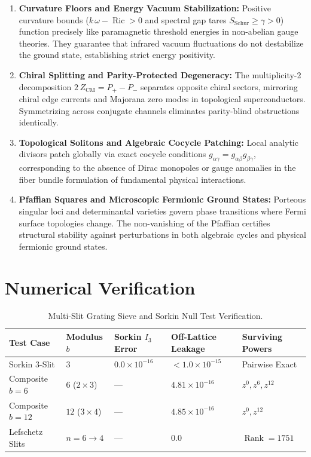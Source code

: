 \documentclass[11pt,a4paper]{article}
\theoremstyle{definition}
\begin{document}
\begin{enumerate}
  \item \textbf{Curvature Floors and Energy Vacuum Stabilization:} 
  Positive curvature bounds ($k\,\omega - \operatorname{Ric} > 0$ and spectral gap tares $S_{\mathrm{Schur}} \ge \gamma > 0$) function precisely like paramagnetic threshold energies in non-abelian gauge theories. They guarantee that infrared vacuum fluctuations do not destabilize the ground state, establishing strict energy positivity.
  
  \item \textbf{Chiral Splitting and Parity-Protected Degeneracy:} 
  The multiplicity-2 decomposition $2\,Z_{\mathrm{CM}} = P_+ - P_-$ separates opposite chiral sectors, mirroring chiral edge currents and Majorana zero modes in topological superconductors. Symmetrizing across conjugate channels eliminates parity-blind obstructions identically.
  
  \item \textbf{Topological Solitons and Algebraic Cocycle Patching:} 
  Local analytic divisors patch globally via exact cocycle conditions $g_{\alpha\gamma} = g_{\alpha\beta} g_{\beta\gamma}$, corresponding to the absence of Dirac monopoles or gauge anomalies in the fiber bundle formulation of fundamental physical interactions.
  
  \item \textbf{Pfaffian Squares and Microscopic Fermionic Ground States:} 
  Porteous singular loci and determinantal varieties govern phase transitions where Fermi surface topologies change. The non-vanishing of the Pfaffian certifies structural stability against perturbations in both algebraic cycles and physical fermionic ground states.
\end{enumerate}

\section{Numerical Verification}

\begin{table}[htbp]
\centering
\caption{Multi-Slit Grating Sieve and Sorkin Null Test Verification.}
\label{tab:compiler}
\footnotesize
\begin{tabular}{@{}>{\raggedright\arraybackslash}p{2.6cm}>{\centering\arraybackslash}p{1.8cm}>{\centering\arraybackslash}p{2.2cm}>{\centering\arraybackslash}p{2.6cm}>{\centering\arraybackslash}p{2.6cm}@{}}
\toprule
Test Case & Modulus $b$ & Sorkin $I_3$ Error & Off-Lattice Leakage & Surviving Powers \\
\midrule
Sorkin 3-Slit & $3$ & $0.0 \times 10^{-16}$ & $< 1.0 \times 10^{-15}$ & Pairwise Exact \\
Composite $b = 6$ & $6$ ($2 \times 3$) & --- & $4.81 \times 10^{-16}$ & $z^0, z^6, z^{12}$ \\
Composite $b = 12$ & $12$ ($3 \times 4$) & --- & $4.85 \times 10^{-16}$ & $z^0, z^{12}$ \\
Lefschetz Slits & $n=6 \to 4$ & --- & $0.0$ & $\operatorname{Rank} = 1751$ \\
\bottomrule
\end{tabular}
\end{table}
\end{document}
